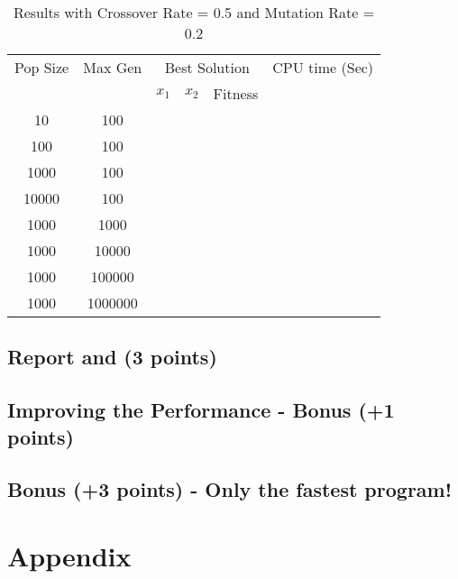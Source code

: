 \documentclass[12pt]{article}
\begin{document}
	\begin{table}[h!]
		\caption{Results with Crossover Rate = 0.5 and Mutation Rate = 0.2}
		\label{table:1}
		\centering
		\begin{tabular}{c c c c c c}
			\hline
			Pop Size & Max Gen & \multicolumn{3}{c}{Best Solution} & CPU time (Sec) \\
			& & $x_1$ & $x_2$ & Fitness & \\
			\hline
			10  & 100    &  &  & &\\
			100 & 100    &  &  & &\\
			1000& 100    &  &   & &\\
			10000& 100    &  &   & &\\
			\hline
			1000  & 1000   &  & & &\\
			1000 & 10000  &  &  & &\\
			1000& 100000 &  &   & &\\
			1000& 1000000 &  &   & &\\
			\hline
		\end{tabular}
	\end{table}
	
	
	\subsection{Report and  (3 points)}
	
	
	
	\subsection{Improving the Performance - Bonus (+1 points)}
	
	
	
	
	\subsection{Bonus (+3 points) - Only the fastest program!}
	
	

	 
	
	\section{Appendix}
	
	
\end{document}
